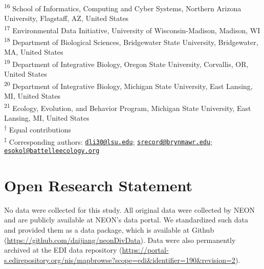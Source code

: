 \documentclass[
  12pt,
]{article}
\begin{document}
\textsuperscript{16} School of Informatics, Computing and Cyber Systems, Northern Arizona University, Flagstaff, AZ, United States\\
\textsuperscript{17} Environmental Data Initiative, University of Wisconsin-Madison, Madison, WI\\
\textsuperscript{18} Department of Biological Sciences, Bridgewater State University, Bridgewater, MA, United States\\
\textsuperscript{19} Department of Integrative Biology, Oregon State University, Corvallis, OR, United States\\
\textsuperscript{20} Department of Integrative Biology, Michigan State University, East Lansing, MI, United States\\
\textsuperscript{21} Ecology, Evolution, and Behavior Program, Michigan State University, East Lansing, MI, United States\\
\textsuperscript{†} Equal contributions\\
\textsuperscript{‡} Corresponding authors: \href{mailto:dli30@lsu.edu}{\nolinkurl{dli30@lsu.edu}}; \href{mailto:srecord@brynmawr.edu}{\nolinkurl{srecord@brynmawr.edu}}; \href{mailto:esokol@battelleecology.org}{\nolinkurl{esokol@battelleecology.org}}

\normalsize

\hypertarget{open-research-statement}{%
\section{Open Research Statement}\label{open-research-statement}}

No data were collected for this study. All original data were collected by NEON and are publicly available at NEON's data portal. We standardized such data and provided them as a data package, which is available at Github (\url{https://github.com/daijiang/neonDivData}). Data were also permanently archived at the EDI data repository (\url{https://portal-s.edirepository.org/nis/mapbrowse?scope=edi\&identifier=190\&revision=2}).
\end{document}
